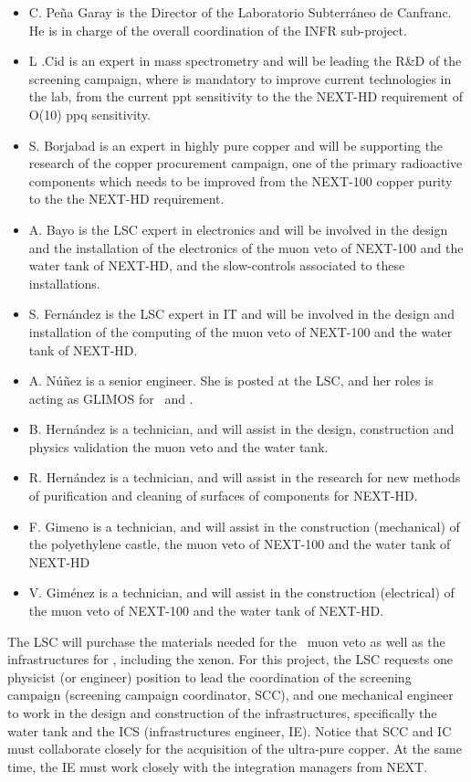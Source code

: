 \begin{itemize}[noitemsep,topsep=0pt,parsep=0pt,partopsep=0pt]
\item C. Peña Garay is the Director of the Laboratorio Subterr\'aneo de Canfranc. He is in charge of the overall coordination of the INFR sub-project.
\item L .Cid is an expert in mass spectrometry and will be leading the R\&D of the screening campaign, where is mandatory to improve current 
technologies in the lab, from the current ppt sensitivity to the the NEXT-HD requirement of O(10) ppq sensitivity.
\item  S. Borjabad is an expert in highly pure copper and will be supporting the research of the copper procurement campaign, one of the primary 
radioactive components which needs to be improved from the NEXT-100 copper purity to the the NEXT-HD requirement.
\item A. Bayo is the LSC expert in electronics and will be involved in the design and the installation of the electronics of the muon veto 
of NEXT-100 and the water tank of NEXT-HD, and the slow-controls associated to these installations.
\item S. Fern\'andez is the LSC expert in IT and will be involved in the design and installation of the computing of the muon veto of NEXT-100 
and the water tank of NEXT-HD.
\item A. N\'u\~nez is a senior engineer. She is posted at the LSC, and her roles is acting as GLIMOS  for \Next\ and \NHD. 
\item B. Hern\'andez  is a technician, and will assist in the design, construction and physics validation the muon veto and the water tank.
\item R. Hern\'andez  is a technician, and will assist in the research for new methods of purification and cleaning of surfaces of components for NEXT-HD.  
\item F. Gimeno is a technician, and will assist in the construction (mechanical) of the polyethylene castle, the muon veto of NEXT-100 and 
the water tank of NEXT-HD
\item V. Gim\'enez is a technician, and will assist in the construction (electrical) of the muon veto of NEXT-100 and the water tank of NEXT-HD.
\end{itemize}

The LSC will purchase the materials needed for the \Next\ muon veto as well as the infrastructures for \NHD, including the xenon. For this project, the LSC requests one physicist (or engineer) position to lead the coordination of the screening campaign (screening campaign coordinator, SCC), and one mechanical engineer to work in the design and construction of the infrastructures, specifically the water tank and the ICS (infrastructures engineer, IE). Notice that SCC and IC must collaborate closely for the acquisition of the ultra-pure copper. At the same time, the IE must work closely with the integration managers from NEXT. 

